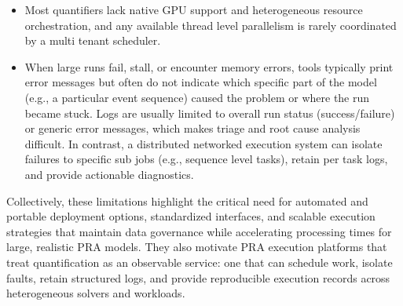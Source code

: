\begin{itemize}

  \item Most quantifiers lack native GPU support and heterogeneous resource orchestration, and any available thread level parallelism is rarely coordinated by a multi tenant scheduler.
  



  \item When large runs fail, stall, or encounter memory errors, tools typically print error messages but often do not indicate which specific part of the model (e.g., a particular event sequence) caused the problem or where the run became stuck. Logs are usually limited to overall run status (success/failure) or generic error messages, which makes triage and root cause analysis difficult. In contrast, a distributed networked execution system can isolate failures to specific sub jobs (e.g., sequence level tasks), retain per task logs, and provide actionable diagnostics.
\end{itemize}

Collectively, these limitations highlight the critical need for automated and portable deployment options, standardized interfaces, and scalable execution strategies that maintain data governance while accelerating processing times for large, realistic PRA models. They also motivate PRA execution platforms that treat quantification as an observable service: one that can schedule work, isolate faults, retain structured logs, and provide reproducible execution records across heterogeneous solvers and workloads.

